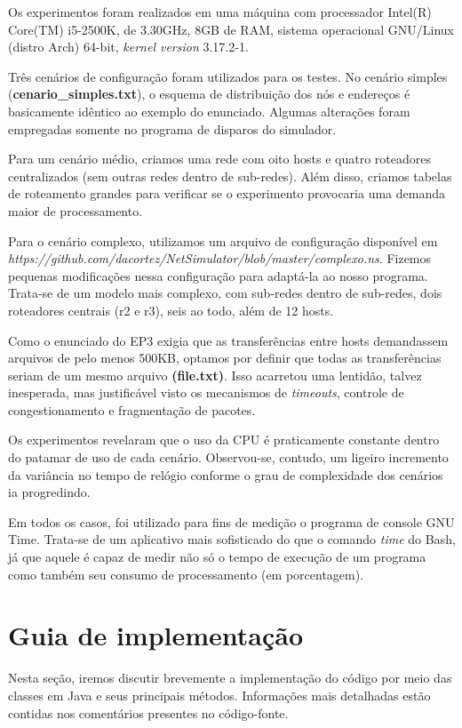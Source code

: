 \documentclass[11pt]{article}
\begin{document}
Os experimentos foram realizados em uma máquina com processador Intel(R) Core(TM) i5-2500K, de 3.30GHz, 8GB de RAM, sistema operacional GNU/Linux (distro Arch) 64-bit, \textit{kernel version} 3.17.2-1.

Três cenários de configuração foram utilizados para os testes. No cenário simples (\textbf{cenario\_simples.txt}), o esquema de distribuição dos nós e endereços é basicamente idêntico ao exemplo do enunciado. Algumas alterações foram empregadas somente no programa de disparos do simulador.

Para um cenário médio, criamos uma rede com oito hosts e quatro roteadores centralizados (sem outras redes dentro de sub-redes). Além disso, criamos tabelas de roteamento grandes para verificar se o experimento provocaria uma demanda maior de processamento.

Para o cenário complexo, utilizamos um arquivo de configuração disponível em \textit{https://github.com/dacortez/NetSimulator/blob/master/complexo.ns}. Fizemos pequenas modificações nessa configuração para adaptá-la ao nosso programa. Trata-se de um modelo mais complexo, com sub-redes dentro de sub-redes, dois roteadores centrais (r2 e r3), seis ao todo, além de 12 hosts.

Como o enunciado do EP3 exigia que as transferências entre hosts demandassem arquivos de pelo menos 500KB, optamos por definir que todas as transferências seriam de um mesmo arquivo \textbf{(file.txt)}. Isso acarretou uma lentidão, talvez inesperada, mas justificável visto os mecanismos de \textit{timeouts}, controle de congestionamento e fragmentação de pacotes.

Os experimentos revelaram que o uso da CPU é praticamente constante dentro do patamar de uso de cada cenário. Observou-se, contudo, um ligeiro incremento da variância no tempo de relógio conforme o grau de complexidade dos cenários ia progredindo.

Em todos os casos, foi utilizado para fins de medição o programa de console GNU Time. Trata-se de um aplicativo mais sofisticado do que o comando \textit{time} do Bash, já que aquele é capaz de medir não só o tempo de execução de um programa como também seu consumo de processamento (em porcentagem).


\section{Guia de implementação}

Nesta seção, iremos discutir brevemente a implementação do código por meio das classes em Java e seus principais métodos. Informações mais detalhadas estão contidas nos comentários presentes no código-fonte.
\end{document}
